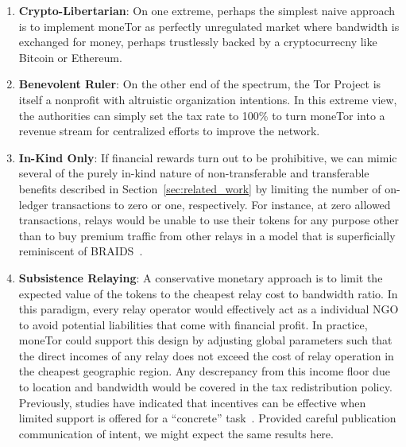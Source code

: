 \begin{enumerate}

\item \textbf{Crypto-Libertarian}: On one extreme, perhaps the simplest naive
approach is to implement moneTor as perfectly unregulated market where bandwidth
is exchanged for money, perhaps trustlessly backed by a cryptocurrecny like
Bitcoin or Ethereum.

\item \textbf{Benevolent Ruler}: On the other end of the spectrum, the Tor
Project is itself a nonprofit with altruistic organization intentions. In this
extreme view, the authorities can simply set the tax rate to 100\% to turn
moneTor into a revenue stream for centralized efforts to improve the network.

\item \textbf{In-Kind Only}: If financial rewards turn out to be
  prohibitive, we can mimic several of the purely in-kind nature of
  non-transferable and transferable benefits described in
  Section~\ref{sec:related_work} by limiting the number of on-ledger
  transactions to zero or one, respectively. For instance, at zero
  allowed transactions, relays would be unable to use their tokens for
  any purpose other than to buy premium traffic from other relays in a
  model that is superficially reminiscent of
  BRAIDS~\cite{jansen2010recruiting}. %

\item \textbf{Subsistence Relaying}: A conservative monetary approach is to limit the
expected value of the tokens to the cheapest relay cost to bandwidth ratio. In this 
paradigm,
every relay operator would effectively act as a individual NGO to avoid
potential liabilities that come with financial profit. In practice, moneTor
could support this design by adjusting global parameters such that the direct
incomes of any relay does not exceed the cost of relay operation in the cheapest
geographic region. Any descrepancy from this income floor due to location and
bandwidth would be covered in the tax redistribution policy. Previously, studies
have indicated that incentives can be effective when limited support is offered
for a ``concrete'' task~\cite{10.1257/jep.25.4.191, 10.1086/431263}. Provided
careful publication communication of intent, we might expect the same results
here.


\end{enumerate}
